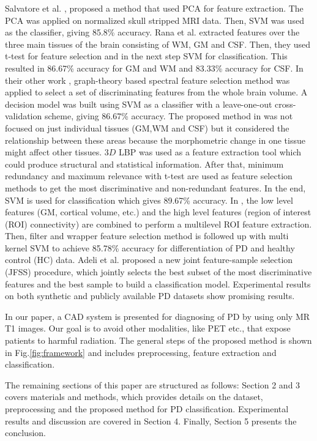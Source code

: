 \documentclass[runningheads,a4paper]{llncs}
\begin{document}
Salvatore et al. \cite{9}, proposed a method that used PCA for feature extraction. The PCA was applied on normalized skull stripped MRI data. Then, SVM was used as the classifier, giving 85.8\% accuracy.
Rana et al. \cite{10} extracted features over the three main tissues of the brain consisting of WM, GM and CSF. Then, they used t-test for feature selection and in the next step SVM for classification. This resulted in 86.67\% accuracy for GM and WM and 83.33\% accuracy for CSF. In their other work \cite{11},  graph-theory based spectral feature selection method was applied to select a set of discriminating features from the whole brain volume. A decision model was built using SVM as a classifier with a leave-one-out cross-validation scheme, giving 86.67\% accuracy. The proposed method in \cite{4} was not focused on just individual tissues (GM,WM and CSF) but it considered the relationship between these areas because the morphometric change in one tissue might affect other tissues. $3D$ LBP was used as a feature extraction tool which could produce structural and statistical information. After that, minimum redundancy and maximum relevance with t-test are used as feature selection methods to get the most discriminative and non-redundant features. In the end, SVM is used for classification which gives 89.67\% accuracy.
In \cite{13}, the low level features (GM, cortical volume, etc.) and the high level features (region of interest (ROI) connectivity) are combined to perform a multilevel ROI feature extraction. Then, filter and wrapper feature selection method is followed up with multi kernel SVM to achieve 85.78\% accuracy for differentiation of PD and healthy control (HC) data.
Adeli et al. \cite{14} proposed a new joint feature-sample selection (JFSS) procedure, which jointly selects the best subset of the most discriminative features and the best sample to build a classification model. Experimental results on both synthetic and publicly available PD datasets show promising results.

In our paper, a CAD system is presented for diagnosing of PD by using only MR T1 images. Our goal is to avoid other modalities, like PET etc., that expose patients to harmful radiation. The general steps of the proposed method is shown in Fig.\ref{fig:framework} and includes preprocessing, feature extraction and classification.

The remaining sections of this paper are structured as follows: Section 2 and 3 covers materials and methods, which provides details on the dataset, preprocessing and the proposed method for PD classification. Experimental results and discussion are covered in Section 4. Finally, Section 5 presents the conclusion.
\end{document}
